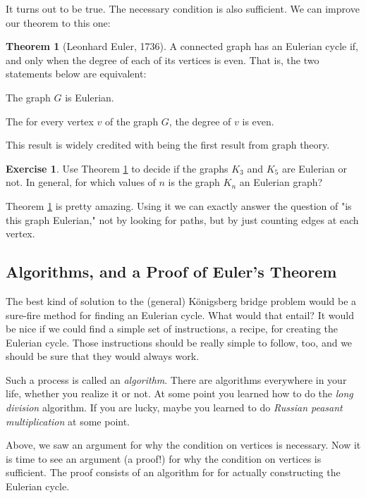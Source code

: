 \documentclass[12pt,letterpaper]{article}
\theoremstyle{definition}
\newtheorem{exercise}[question]{Exercise}
\newtheorem*{theorem}{Theorem}
\begin{document}
It turns out to be true. The necessary condition is also sufficient. We can improve our theorem to this one:

\begin{theorem}[Leonhard Euler, 1736] \label{thm:euler}
A connected graph has an Eulerian cycle if, and only when the degree of each of its vertices is even. 
That is, the two statements below are equivalent:
\begin{compactitem}
\item The graph $G$ is Eulerian.
\item The for every vertex $v$ of the graph $G$, the degree of $v$ is even.
\end{compactitem}
\end{theorem}

This result is widely credited with being the first result from graph theory. 

\begin{exercise}
Use Theorem \ref{thm:euler} to decide if the graphs $K_3$ and $K_5$ are Eulerian or not.
In general, for which values of $n$ is the graph $K_n$ an Eulerian graph?
\end{exercise}

Theorem \ref{thm:euler} is pretty amazing. Using it we can exactly answer the question of "is this graph
Eulerian," not by looking for paths, but by just counting edges at each vertex.

\subsection*{Algorithms, and a Proof of Euler's Theorem}

The best kind of solution to the (general) K\"{o}nigsberg bridge problem would be a sure-fire method for
finding an Eulerian cycle. What would that entail? It would be nice if we could find a simple set of instructions,
a recipe, for creating the Eulerian cycle. Those instructions should be really simple to follow, too, and we should
be sure that they would always work.

Such a process is called an \emph{algorithm}.  There are algorithms everywhere in your life, whether you realize it
or not. At some point you learned how to do the \emph{long division} algorithm. If you are lucky, maybe you 
learned to do \emph{Russian peasant multiplication} at some point.

Above, we saw an argument for why the condition on vertices is necessary. Now it is time to see an argument 
(a proof!) for why the condition on vertices is sufficient. The proof consists of an algorithm for for actually 
constructing the Eulerian cycle.
\end{document}
